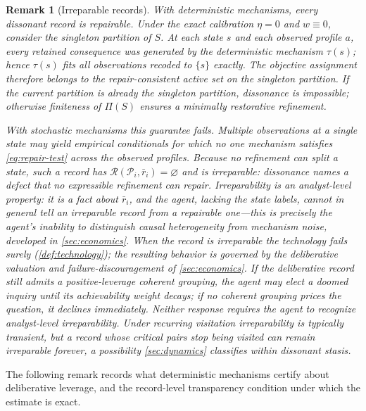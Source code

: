 \documentclass[11pt]{article}
\newtheorem{remark}[assumption]{Remark}
\theoremstyle{definition}
\newcommand{\emptysetset}{\varnothing}
\begin{document}
\begin{remark}[Irreparable records]
\label{rem:irreparable}
With deterministic mechanisms, every dissonant record is repairable.
Under the exact calibration $\eta=0$ and $w\equiv0$, consider the singleton partition of $S$.
At each state $s$ and each observed profile $a$, every retained consequence was generated by the deterministic mechanism $\tau(s)$; hence $\tau(s)$ fits all observations recoded to $\{s\}$ exactly.
The objective assignment therefore belongs to the repair-consistent active set on the singleton partition.
If the current partition is already the singleton partition, dissonance is impossible; otherwise finiteness of $\Pi(S)$ ensures a minimally restorative refinement.

With stochastic mechanisms this guarantee fails.
Multiple observations at a single state may yield empirical conditionals for which no one mechanism satisfies \cref{eq:repair-test} across the observed profiles.
Because no refinement can split a state, such a record has $\mathcal R(\mathcal P_i,\bar r_i)=\emptysetset$ and is \emph{irreparable}: dissonance names a defect that no expressible refinement can repair.
Irreparability is an analyst-level property: it is a fact about $\bar r_i$, and the agent, lacking the state labels, cannot in general tell an irreparable record from a repairable one---this is precisely the agent's inability to distinguish causal heterogeneity from mechanism noise, developed in \cref{sec:economics}.
When the record is irreparable the technology fails surely (\cref{def:technology}); the resulting behavior is governed by the deliberative valuation and failure-discouragement of \cref{sec:economics}.
If the deliberative record still admits a positive-leverage coherent grouping, the agent may elect a doomed inquiry until its achievability weight decays; if no coherent grouping prices the question, it declines immediately.
Neither response requires the agent to recognize analyst-level irreparability.
Under recurring visitation irreparability is typically transient, but a record whose critical pairs stop being visited can remain irreparable forever, a possibility \cref{sec:dynamics} classifies within dissonant stasis.
\end{remark}

The following remark records what deterministic mechanisms certify about deliberative leverage, and the record-level transparency condition under which the estimate is exact.
\end{document}
